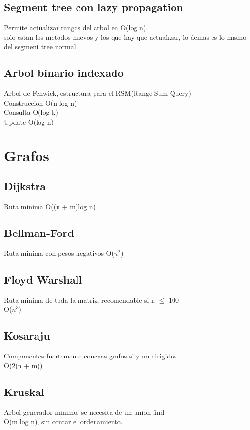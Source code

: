 \documentclass[10pt,landscape,twocolumn,a4paper,notitlepage]{article}
\newcommand\cppfile[2][]{

}
\begin{document}
			\subsection{Segment tree con lazy propagation}
			Permite actualizar rangos del arbol en O(log n).\\
			solo estan los metodos nuevos y los que hay que actualizar, 
			lo demas es lo mismo del segment tree normal.
			\cppfile[29-84]{estructuras_de_datos/segment_tree_lazy_propagation.cpp}
			\subsection{Arbol binario indexado}
			Arbol de Fenwick, estructura para el RSM(Range Sum Query)\\
			Construccion O(n log n) \\Consulta O(log k)\\Update O(log n)
			\cppfile[8-39]{estructuras_de_datos/arbol_binario_indexado.cpp}
			
		\section{Grafos}
			\subsection{Dijkstra}
			Ruta minima
			O((n + m)log n)
			\cppfile[7-50]{grafos/dijkstra.cpp}
			\subsection{Bellman-Ford}
			Ruta minima con pesos negativos
			O($n^{2}$)
			\cppfile[5-37]{grafos/bellman-Ford.cpp}
			\subsection{Floyd Warshall}
			Ruta minima de toda la matriz, recomendable si n $\leq$ 100\\	
			O($n^{3}$)
			\cppfile[4-19]{grafos/floyd.cpp}
			\subsection{Kosaraju}
			Componentes fuertemente conexas grafos si y no dirigidos\\
			O(2(n + m))
			\cppfile[7-45]{grafos/kosaraju.cpp}
			\subsection{Kruskal}
			Arbol generador minimo, se necesita de un union-find\\
			O(m log n), sin contar el ordenamiento.
			\cppfile[43-67]{grafos/kruskal.cpp}
\end{document}
